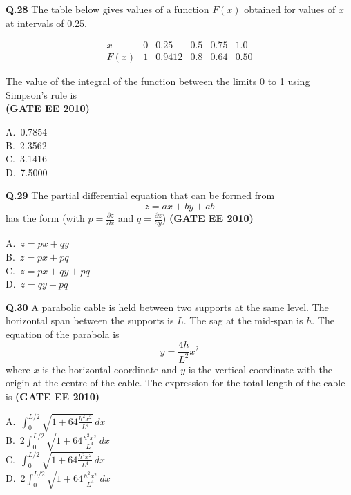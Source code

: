 \documentclass[journal,12pt,onecolumn]{exam}
\theoremstyle{remark}
\begin{document}
\noindent\textbf{Q.28} The table below gives values of a function $F(x)$ obtained for values of $x$ at intervals of 0.25.

\[
\begin{array}{c|c|c|c|c|c}
x & 0 & 0.25 & 0.5 & 0.75 & 1.0 \\
\hline
F(x) & 1 & 0.9412 & 0.8 & 0.64 & 0.50
\end{array}
\]

The value of the integral of the function between the limits 0 to 1 using Simpson's rule is
\\ \hfill\textbf{(GATE EE 2010)}
\begin{multicols}{4}
A.\ 0.7854 \\
B.\ 2.3562 \\
C.\ 3.1416 \\
D.\ 7.5000
\end{multicols}



\noindent\textbf{Q.29} The partial differential equation that can be formed from 
\[
z = ax + by + ab
\]
has the form (with $p = \frac{\partial z}{\partial x}$ and $q = \frac{\partial z}{\partial y}$)
\hfill\textbf{(GATE EE 2010)}
\begin{multicols}{4}
A.\ $z = px + qy$ \\
B.\ $z = px + pq$ \\
C.\ $z = px + qy + pq$ \\
D.\ $z = qy + pq$
\end{multicols}

\noindent\textbf{Q.30} A parabolic cable is held between two supports at the same level. The horizontal span between the supports is $L$. The sag at the mid-span is $h$. The equation of the parabola is 
\[
y = \frac{4h}{L^2} x^2
\]
where $x$ is the horizontal coordinate and $y$ is the vertical coordinate with the origin at the centre of the cable. The expression for the total length of the cable is
\hfill\textbf{(GATE EE 2010)}

A.\ $\int_0^{L/2} \sqrt{1 + 64 \frac{h^2 x^2}{L^4}} \, dx$ \\
B.\ $2 \int_0^{L/2} \sqrt{1 + 64 \frac{h^2 x^2}{L^4}} \, dx$ \\
C.\ $\int_0^{L/2} \sqrt{1 + 64 \frac{h^2 x^2}{L^4}} \, dx$ \\
D.\ $2 \int_0^{L/2} \sqrt{1 + 64 \frac{h^2 x^2}{L^4}} \, dx$
\end{document}
